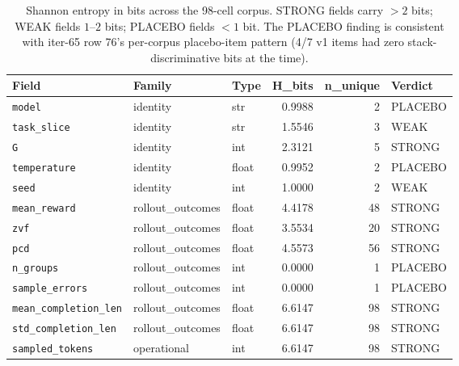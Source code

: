 \documentclass{article}  \usepackage[preprint,nonatbib]{neurips_2026} \usepackage[numbers]{natbib}
\begin{document}
\begin{table}[h]
\centering\scriptsize
\begin{tabular}{lllrrl}
\hline
\textbf{Field} & \textbf{Family} & \textbf{Type} & \textbf{H\_bits} & \textbf{n\_unique} & \textbf{Verdict} \\
\hline
\texttt{model}                    & identity        & str   & 0.9988 & 2  & PLACEBO \\
\texttt{task\_slice}               & identity        & str   & 1.5546 & 3  & WEAK    \\
\texttt{G}                        & identity        & int   & 2.3121 & 5  & STRONG  \\
\texttt{temperature}              & identity        & float & 0.9952 & 2  & PLACEBO \\
\texttt{seed}                     & identity        & int   & 1.0000 & 2  & WEAK    \\
\texttt{mean\_reward}             & rollout\_outcomes & float & 4.4178 & 48 & STRONG  \\
\texttt{zvf}                      & rollout\_outcomes & float & 3.5534 & 20 & STRONG  \\
\texttt{pcd}                      & rollout\_outcomes & float & 4.5573 & 56 & STRONG  \\
\texttt{n\_groups}                & rollout\_outcomes & int   & 0.0000 & 1  & PLACEBO \\
\texttt{sample\_errors}           & rollout\_outcomes & int   & 0.0000 & 1  & PLACEBO \\
\texttt{mean\_completion\_len}    & rollout\_outcomes & float & 6.6147 & 98 & STRONG  \\
\texttt{std\_completion\_len}     & rollout\_outcomes & float & 6.6147 & 98 & STRONG  \\
\texttt{sampled\_tokens}          & operational     & int   & 6.6147 & 98 & STRONG  \\
\hline
\end{tabular}
\caption{Shannon entropy in bits across the 98-cell corpus. STRONG
fields carry $> 2$ bits; WEAK fields $1$--$2$ bits; PLACEBO fields
$< 1$ bit. The PLACEBO finding is consistent with iter-65 row 76's
per-corpus placebo-item pattern (4/7 v1 items had zero stack-discriminative
bits at the time).}
\label{tab:p5-v25-placebo}
\end{table}
\end{document}
